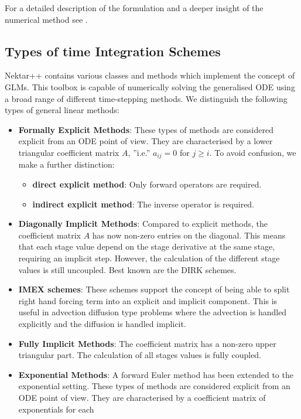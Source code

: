 For a detailed description of the formulation and a deeper insight of the
numerical method see \cite{Vostime}.


\subsection{Types of time Integration Schemes}
Nektar++ contains various classes and methods which implement the concept of
GLMs. This toolbox is capable of numerically solving the generalised ODE using a
broad range of different time-stepping methods. We distinguish the following
types of general linear methods:
\begin{itemize}
\item \textbf{Formally Explicit Methods}: These types of methods are
considered explicit from an ODE point of view. They are characterised by a lower
  triangular coefficient matrix $A$, ''i.e.'' $a_{ij} = 0$
  for $j\geq i$. To avoid confusion, we make a further distinction:
  \begin{itemize}
    \item \textbf{direct explicit method}: Only forward operators are required.
    \item \textbf{indirect explicit method}: The inverse operator is required.
  \end{itemize}
  \item \textbf{Diagonally Implicit Methods}: Compared to explicit methods,
  the coefficient matrix $A$ has now non-zero entries on the diagonal.
  This means that each stage value depend on the stage derivative at the same
  stage, requiring an implicit step. However, the calculation of the different
  stage values is still uncoupled. Best known are the DIRK schemes.
  \item \textbf{IMEX schemes}: These schemes support the concept of being able
  to split right hand forcing term into an explicit and implicit component. This is
  useful in advection diffusion type problems where the advection is handled
  explicitly and the diffusion is handled implicit.
  \item \textbf{Fully Implicit Methods}: The coefficient matrix has a
  non-zero upper triangular part. The calculation of all stages values is fully coupled.
  \item \textbf{Exponential Methods}: A forward Euler method has been
    extended to the exponential setting. These types of methods are
    considered explicit from an ODE point of view. They are
    characterised by a coefficient matrix of exponentials for each

\end{itemize}
